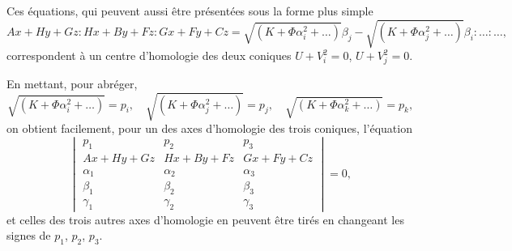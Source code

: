 \documentclass[12pt,a4paper]{article}
\theoremstyle{definition}
\begin{document}
Ces \'{e}quations, qui peuvent aussi \^{e}tre pr\'{e}sent\'{e}es sous la forme plus simple
\begin{equation}\tag{2}
Ax + Hy + Gz : Hx + By + Fz : Gx + Fy + Cz = \sqrt{(K + \Phi\alpha_i^2 + \ldots)}\beta_j - \sqrt{(K + \Phi\alpha_j^2 + \ldots)}\beta_i : \ldots : \ldots,
\end{equation}
correspondent \`{a} un centre d'homologie des deux coniques $U + V_i^2 = 0$, $U + V_j^2 = 0$.

En mettant, pour abr\'{e}ger,
\begin{equation}\tag{3}
\sqrt{(K + \Phi\alpha_i^2 + \ldots)} = p_i, \quad \sqrt{(K + \Phi\alpha_j^2 + \ldots)} = p_j, \quad \sqrt{(K + \Phi\alpha_k^2 + \ldots)} = p_k,
\end{equation}
on obtient facilement, pour un des axes d'homologie des trois coniques, l'\'{e}quation
\begin{equation}\tag{4}
\begin{vmatrix}
p_1 & p_2 & p_3 \\
Ax + Hy + Gz & Hx + By + Fz & Gx + Fy + Cz \\
\alpha_1 & \alpha_2 & \alpha_3 \\
\beta_1 & \beta_2 & \beta_3 \\
\gamma_1 & \gamma_2 & \gamma_3
\end{vmatrix} = 0,
\end{equation}
et celles des trois autres axes d'homologie en peuvent \^{e}tre tir\'{e}s en changeant les signes de $p_1$, $p_2$, $p_3$.
\end{document}
